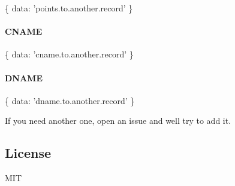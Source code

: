 \begin{DoxyCode}
\{
  data: 'points.to.another.record'
\}
\end{DoxyCode}


\paragraph*{{\ttfamily C\+N\+A\+ME}}


\begin{DoxyCode}
\{
  data: 'cname.to.another.record'
\}
\end{DoxyCode}


\paragraph*{{\ttfamily D\+N\+A\+ME}}


\begin{DoxyCode}
\{
  data: 'dname.to.another.record'
\}
\end{DoxyCode}


If you need another one, open an issue and we\textquotesingle{}ll try to add it.

\subsection*{License}

M\+IT 
